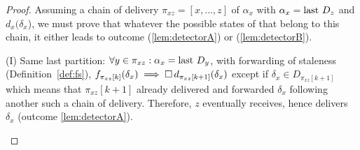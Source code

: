 \begin{proof}
  Assuming a chain of delivery $\pi_{xz} = [x, \ldots, z]$ of
  $\alpha_x$ with $\alpha_x = \textup{last}~ D_z$ and $d_x(\delta_x$), we must
  prove that whatever the possible states of \nodes that belong to
  this chain, it either leads to outcome (\ref{lem:detectorA}) or
  (\ref{lem:detectorB}).
  \begin{asparadesc}
  \item [(I) Same last partition:] $\forall y \in \pi_{xz}: \alpha_x =
    \textup{last}~ D_y$, with forwarding of staleness
    (Definition~\ref{def:fs}), $f_{\pi_{xz}[k]}(\delta_x) \implies
    \square\, d_{\pi_{xz}[k+1]}(\delta_x)$ except if $\delta_x \in
    D_{\pi_{xz}[k+1]}$ which means that $\pi_{xz}[k+1]$ already
    delivered and forwarded $\delta_x$ following another such a chain
    of delivery. Therefore, $z$ eventually receives, hence delivers
    $\delta_x$ (outcome \ref{lem:detectorA}).
    

\end{asparadesc}
\end{proof}
